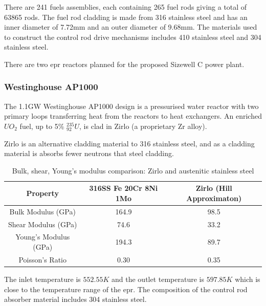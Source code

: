 There are 241 fuels assemblies, each containing 265 fuel rods giving a total of 63865 rods.  The fuel rod cladding is made from 316 stainless steel and has an inner diameter of 7.72mm and an outer diameter of 9.68mm.  The materials used to construct the control rod drive mechanisms includes 410 stainless steel and 304 stainless steel.

There are two \acrshort{epr} reactors planned for the proposed Sizewell C power plant.


\subsubsection{Westinghouse AP1000}

The 1.1GW Westinghouse AP1000 design is a pressurised water reactor with two primary loops transferring heat from the reactors to heat exchangers.  An enriched $UO_2$ fuel, up to 5\% ${}^{235}_{92}U$, is clad in Zirlo (a proprietary \Gls{Zr} alloy).  

Zirlo is an alternative cladding material to 316 stainless steel, and as a cladding material is absorbs fewer neutrons that steel cladding.  

\begin{table}[h]
\begin{center}
\renewcommand{\arraystretch}{1.2}
\begin{tabular}{c c c}
\hline\hline
Property & 316SS Fe 20Cr 8Ni 1Mo & Zirlo (Hill Approximaton) \\
\hline\hline
Bulk Modulus (GPa)     & 164.9 \cite{elasticprofecr}  & 98.5 \cite{crystengcommzirlo} \\
Shear Modulus (GPa)    & 74.6 \cite{elasticprofecr}   & 33.2 \cite{crystengcommzirlo} \\
Young's Modulus (GPa)  & 194.3 \cite{elasticprofecr}  & 89.7 \cite{crystengcommzirlo} \\
Poisson's Ratio        & 0.30 \cite{elasticprofecr}   & 0.35 \cite{crystengcommzirlo} \\
\hline\hline
\end{tabular}
\end{center}
\caption{Bulk, shear, Young's modulus comparison: Zirlo and austenitic stainless steel }
\end{table}

The inlet temperature is $552.55K$ and the outlet temperature is $597.85K$ which is close to the temperature range of the \acrshort{epr}.  The composition of the control rod absorber material includes 304 stainless steel.










